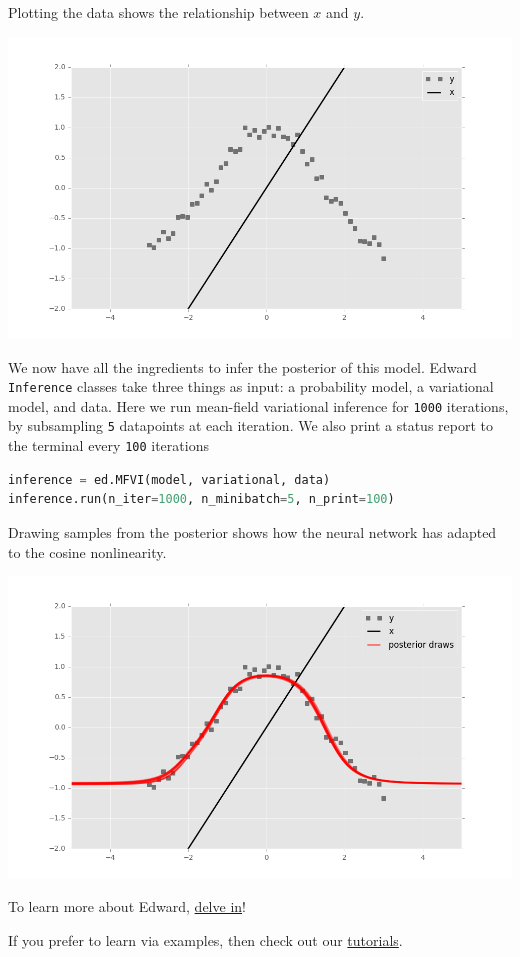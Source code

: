 Plotting the data shows the relationship between $x$ and $y$.

\includegraphics[width=700px]{images/getting-started-fig0.png}

We now have all the ingredients to infer the posterior of this model. 
Edward \texttt{Inference} classes take three things as input: a
probability model, a variational model, and data. Here we run mean-field
variational inference for \texttt{1000} iterations, by subsampling \texttt{5}
datapoints at each
iteration. We also print a status report to the terminal every \texttt{100}
iterations
\begin{lstlisting}[language=Python]
inference = ed.MFVI(model, variational, data)
inference.run(n_iter=1000, n_minibatch=5, n_print=100)  
\end{lstlisting}

Drawing samples from the posterior shows how the neural network has adapted to
the cosine nonlinearity. 

\includegraphics[width=700px]{images/getting-started-fig2.png}

To learn more about Edward, \href{delving-in.html}{delve in}!

If you prefer to learn via examples, then check out our 
\href{tutorials.html}{tutorials}.

